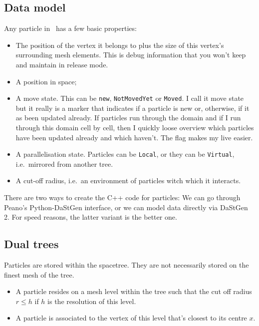 \subsection{Data model}
\label{section:swift:backbone:data-model}


Any particle in \Peano\ has a few basic properties:

\begin{itemize}
  \item The position of the vertex it belongs to plus the size of this vertex's
  surrounding mesh elements. This is debug information that you won't keep and
  maintain in release mode.
  \item A position in space;
  \item A move state. This can be \texttt{new}, \texttt{NotMovedYet} or
  \texttt{Moved}. I call it move state but it really is a marker that indicates
  if a particle is new or, otherwise, if it as been updated already. If
  particles run through the domain and if I run through this domain cell by
  cell, then I quickly loose overview which particles have been updated already
  and which haven't. The flag makes my live easier.
  \item A parallelisation state. Particles can be \texttt{Local}, or they can
  be \texttt{Virtual}, i.e.~mirrored from another tree.
  \item A cut-off radius, i.e.~an environment of particles witch which it
  interacts.
\end{itemize}


\noindent
There are two ways to create the C++ code for particles: 
We can go through Peano's Python-DaStGen interface, or we can model data
directly via DaStGen 2.
For speed reasons, the latter variant is the better one.







\subsection{Dual trees}
\label{section:swift:backbone:dual-trees}

Particles are stored within the spacetree.
They are not necessarily stored on the finest mesh of the tree.

\begin{itemize}
  \item A particle resides on a mesh level within the tree such that the
  cut off radius $r \leq h$ if $h$ is the resolution of this level.
  \item A particle is associated to the vertex of this level that's closest to
  its centre $x$.
\end{itemize}

